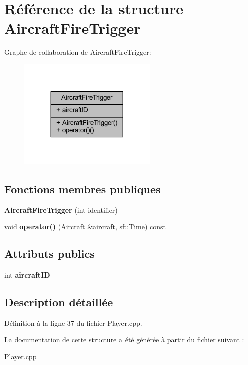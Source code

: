 \hypertarget{struct_aircraft_fire_trigger}{}\section{Référence de la structure Aircraft\+Fire\+Trigger}
\label{struct_aircraft_fire_trigger}


Graphe de collaboration de Aircraft\+Fire\+Trigger\+:\nopagebreak
\begin{figure}[H]
\begin{center}
\leavevmode
\includegraphics[width=188pt]{struct_aircraft_fire_trigger__coll__graph}
\end{center}
\end{figure}
\subsection*{Fonctions membres publiques}
\begin{DoxyCompactItemize}
\item 
\hypertarget{struct_aircraft_fire_trigger_a98857d290c7cedcfae7dd416d0c1ce6a}{}\label{struct_aircraft_fire_trigger_a98857d290c7cedcfae7dd416d0c1ce6a} 
{\bfseries Aircraft\+Fire\+Trigger} (int identifier)
\item 
\hypertarget{struct_aircraft_fire_trigger_ae155e735c722f7c821af34939d789628}{}\label{struct_aircraft_fire_trigger_ae155e735c722f7c821af34939d789628} 
void {\bfseries operator()} (\hyperlink{class_aircraft}{Aircraft} \&aircraft, sf\+::\+Time) const
\end{DoxyCompactItemize}
\subsection*{Attributs publics}
\begin{DoxyCompactItemize}
\item 
\hypertarget{struct_aircraft_fire_trigger_a57481c8c8d112cfe7fc689879f768bb3}{}\label{struct_aircraft_fire_trigger_a57481c8c8d112cfe7fc689879f768bb3} 
int {\bfseries aircraft\+ID}
\end{DoxyCompactItemize}


\subsection{Description détaillée}


Définition à la ligne 37 du fichier Player.\+cpp.



La documentation de cette structure a été générée à partir du fichier suivant \+:\begin{DoxyCompactItemize}
\item 
Player.\+cpp\end{DoxyCompactItemize}
